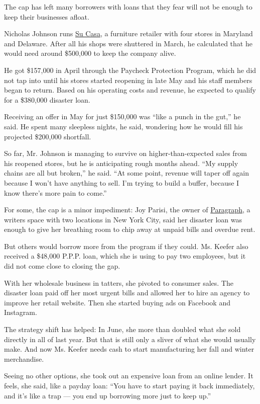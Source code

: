 The cap has left many borrowers with loans that they fear will not be
enough to keep their businesses afloat.

Nicholas Johnson runs \href{http://sucasa-furniture.com/}{Su Casa}, a
furniture retailer with four stores in Maryland and Delaware. After all
his shops were shuttered in March, he calculated that he would need
around \$500,000 to keep the company alive.

He got \$157,000 in April through the Paycheck Protection Program, which
he did not tap into until his stores started reopening in late May and
his staff members began to return. Based on his operating costs and
revenue, he expected to qualify for a \$380,000 disaster loan.

Receiving an offer in May for just \$150,000 was ``like a punch in the
gut,'' he said. He spent many sleepless nights, he said, wondering how
he would fill his projected \$200,000 shortfall.

So far, Mr. Johnson is managing to survive on higher-than-expected sales
from his reopened stores, but he is anticipating rough months ahead.
``My supply chains are all but broken,'' he said. ``At some point,
revenue will taper off again because I won't have anything to sell. I'm
trying to build a buffer, because I know there's more pain to come.''

For some, the cap is a minor impediment: Joy Parisi, the owner of
\href{https://www.paragraphny.com/}{Paragraph}, a writers space with two
locations in New York City, said her disaster loan was enough to give
her breathing room to chip away at unpaid bills and overdue rent.

But others would borrow more from the program if they could. Ms. Keefer
also received a \$48,000 P.P.P. loan, which she is using to pay two
employees, but it did not come close to closing the gap.

With her wholesale business in tatters, she pivoted to consumer sales.
The disaster loan paid off her most urgent bills and allowed her to hire
an agency to improve her retail website. Then she started buying ads on
Facebook and Instagram.

The strategy shift has helped: In June, she more than doubled what she
sold directly in all of last year. But that is still only a sliver of
what she would usually make. And now Ms. Keefer needs cash to start
manufacturing her fall and winter merchandise.

Seeing no other options, she took out an expensive loan from an online
lender. It feels, she said, like a payday loan: ``You have to start
paying it back immediately, and it's like a trap --- you end up
borrowing more just to keep up.''


